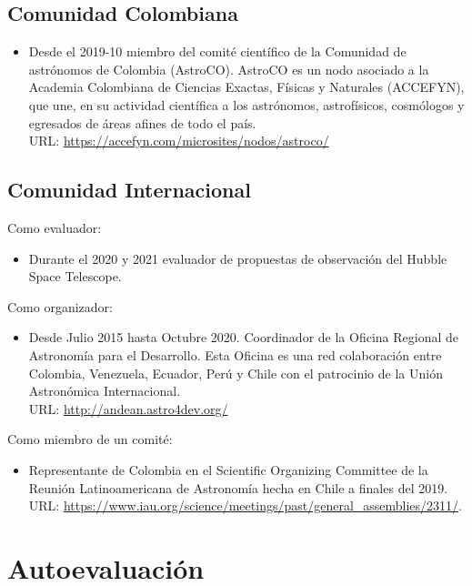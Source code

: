 \documentclass{article}
\begin{document}
\subsection{Comunidad Colombiana}

\begin{itemize}
\item {Desde el 2019-10 miembro del comit\'e cient\'ifico de la Comunidad de astrónomos de Colombia (AstroCO). AstroCO es un nodo asociado a la Academia Colombiana de Ciencias Exactas, Físicas y Naturales (ACCEFYN), que une, en su actividad científica a los astrónomos, astrofísicos, cosmólogos y egresados de áreas afines de todo el país.\\

URL: \url{https://accefyn.com/microsites/nodos/astroco/}}
\end{itemize}


\subsection{Comunidad Internacional}

Como evaluador:
\begin{itemize}
\item Durante el 2020 y 2021 evaluador de propuestas de observaci\'on del Hubble Space Telescope.
\end{itemize}


Como organizador:
\begin{itemize}
\item {Desde Julio 2015 hasta Octubre 2020. Coordinador de la Oficina Regional de
  Astronom\'ia para el Desarrollo. Esta Oficina es una red
  colaboraci\'on entre Colombia, Venezuela, Ecuador, Per\'u y Chile
  con el patrocinio de la Uni\'on Astron\'omica Internacional.\\ 
URL: \url{http://andean.astro4dev.org/}}    
\end{itemize}

Como miembro de un comit\'e:
\begin{itemize}
\item Representante de Colombia en el
  Scientific Organizing Committee de la Reuni\'on Latinoamericana de
  Astronom\'ia hecha en Chile a finales del 2019.\\
  URL: \url{https://www.iau.org/science/meetings/past/general_assemblies/2311/}.
\end{itemize}


\section{Autoevaluaci\'on}
\end{document}
